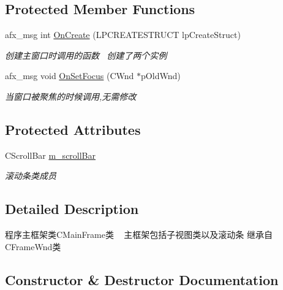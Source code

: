 \subsection*{Protected Member Functions}
\begin{DoxyCompactItemize}
\item 
afx\+\_\+msg int \hyperlink{class_c_main_frame_a48666466fd37412fcaeff75c3b12e0ed}{On\+Create} (L\+P\+C\+R\+E\+A\+T\+E\+S\+T\+R\+U\+CT lp\+Create\+Struct)
\begin{DoxyCompactList}\small\item\em 创建主窗口时调用的函数~\newline
创建了两个实例~\newline
\end{DoxyCompactList}\item 
\mbox{\label{class_c_main_frame_adc353a3d1fc497fbc009b6d9e6914a82}} 
afx\+\_\+msg void \hyperlink{class_c_main_frame_adc353a3d1fc497fbc009b6d9e6914a82}{On\+Set\+Focus} (C\+Wnd $\ast$p\+Old\+Wnd)
\begin{DoxyCompactList}\small\item\em 当窗口被聚焦的时候调用,无需修改 \end{DoxyCompactList}\end{DoxyCompactItemize}
\subsection*{Protected Attributes}
\begin{DoxyCompactItemize}
\item 
\mbox{\label{class_c_main_frame_afa369311a084e7ff2af17a819829b21b}} 
C\+Scroll\+Bar \hyperlink{class_c_main_frame_afa369311a084e7ff2af17a819829b21b}{m\+\_\+scroll\+Bar}
\begin{DoxyCompactList}\small\item\em 滚动条类成员 \end{DoxyCompactList}\end{DoxyCompactItemize}


\subsection{Detailed Description}
程序主框架类\+C\+Main\+Frame类 ~\newline
主框架包括子视图类以及滚动条 继承自\+C\+Frame\+Wnd类 

\subsection{Constructor \& Destructor Documentation}
\mbox{\label{class_c_main_frame_af3e997aeae4148d2aaa4a1e1ae7bdd53}} 
